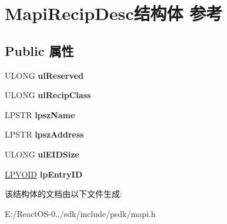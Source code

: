 \hypertarget{struct_mapi_recip_desc}{}\section{Mapi\+Recip\+Desc结构体 参考}
\label{struct_mapi_recip_desc}
\subsection*{Public 属性}
\begin{DoxyCompactItemize}
\item 
\mbox{\label{struct_mapi_recip_desc_ad055103591acf73d1fc7cb14c7776c38}} 
U\+L\+O\+NG {\bfseries ul\+Reserved}
\item 
\mbox{\label{struct_mapi_recip_desc_a12fd3a56ba39eb209b645c47010b93a9}} 
U\+L\+O\+NG {\bfseries ul\+Recip\+Class}
\item 
\mbox{\label{struct_mapi_recip_desc_a81ae20fdd8e58abed4fd40842862ebad}} 
L\+P\+S\+TR {\bfseries lpsz\+Name}
\item 
\mbox{\label{struct_mapi_recip_desc_ac35e121c571156fe88b2d8e65f32310d}} 
L\+P\+S\+TR {\bfseries lpsz\+Address}
\item 
\mbox{\label{struct_mapi_recip_desc_a1b3035933cb932bdef28f638a9200c49}} 
U\+L\+O\+NG {\bfseries ul\+E\+I\+D\+Size}
\item 
\mbox{\label{struct_mapi_recip_desc_a2c4c9dff5be9688f2b609650fcaeb3d7}} 
\hyperlink{interfacevoid}{L\+P\+V\+O\+ID} {\bfseries lp\+Entry\+ID}
\end{DoxyCompactItemize}


该结构体的文档由以下文件生成\+:\begin{DoxyCompactItemize}
\item 
E\+:/\+React\+O\+S-\/0../sdk/include/psdk/mapi.\+h\end{DoxyCompactItemize}
